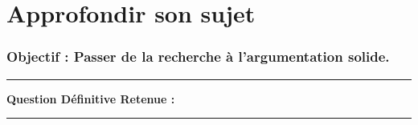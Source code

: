 \setcounter{section}{0}

\chapter*{Approfondir son sujet}
\subsection*{\centering Objectif : Passer de la recherche à l'argumentation solide.}

\vspace{0.5cm}

\hrule
\vspace{0.2cm}

\textbf{Question Définitive Retenue :} \dotfill

\vspace{0.2cm}
\hrule
\vspace{0.5cm}

